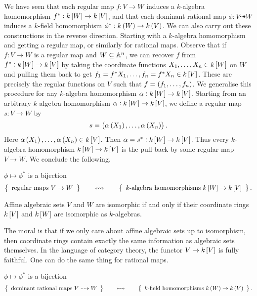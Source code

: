 We have seen that each regular map $ f : V \to W $ induces a $ k $-algebra homomorphism $ f^* : k\sbr{W} \to k\sbr{V} $, and that each dominant rational map $ \phi : V \dashrightarrow W $ induces a $ k $-field homomorphism $ \phi^* : k\br{W} \to k\br{V} $. We can also carry out these constructions in the reverse direction. Starting with a $ k $-algebra homomorphism and getting a regular map, or similarly for rational maps. Observe that if $ f : V \to W $ is a regular map and $ W \subseteq \AA^n $, we can recover $ f $ from $ f^* : k\sbr{W} \to k\sbr{V} $ by taking the coordinate functions $ X_1, \dots, X_n \in k\sbr{W} $ on $ W $ and pulling them back to get $ f_1 = f^*X_1, \dots, f_n = f^*X_n \in k\sbr{V} $. These are precisely the regular functions on $ V $ such that $ f = \br{f_1, \dots, f_n} $. We generalise this procedure for any $ k $-algebra homomorphism $ \alpha : k\sbr{W} \to k\sbr{V} $. Starting from an arbitrary $ k $-algebra homomorphism $ \alpha : k\sbr{W} \to k\sbr{V} $, we define a regular map $ s : V \to W $ by
$$ s = \br{\alpha\br{X_1}, \dots, \alpha\br{X_n}}. $$
Here $ \alpha\br{X_1}, \dots, \alpha\br{X_n} \in k\sbr{V} $. Then $ \alpha = s^* : k\sbr{W} \to k\sbr{V} $. Thus every $ k $-algebra homomorphism $ k\sbr{W} \to k\sbr{V} $ is the pull-back by some regular map $ V \to W $. We conclude the following.

\begin{proposition}
$ \phi \mapsto \phi^* $ is a bijection
$$ \correspondence{\text{regular maps} \ V \to W}{\text{$ k $-algebra homomorphisms} \ k\sbr{W} \to k\sbr{V}}. $$
\end{proposition}

\begin{corollary}
Affine algebraic sets $ V $ and $ W $ are isomorphic if and only if their coordinate rings $ k\sbr{V} $ and $ k\sbr{W} $ are isomorphic as $ k $-algebras.
\end{corollary}

The moral is that if we only care about affine algebraic sets up to isomorphism, then coordinate rings contain exactly the same information as algebraic sets themselves. In the language of category theory, the functor $ V \to k\sbr{V} $ is fully faithful. One can do the same thing for rational maps.

\begin{proposition}
$ \phi \mapsto \phi^* $ is a bijection
$$ \correspondence{\text{dominant rational maps} \ V \dashrightarrow W}{\text{$ k $-field homomorphisms} \ k\br{W} \to k\br{V}}. $$
\end{proposition}

